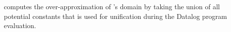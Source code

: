 
\noindent \code{[Dom]} computes the over-approximation of \code{\alpha}'s domain by taking the union of all potential constants that \code{\alpha} is used for unification during the Datalog program evaluation. 



